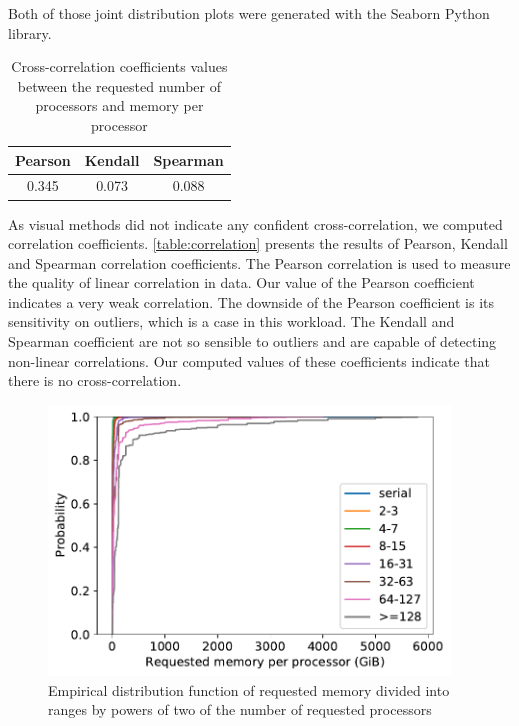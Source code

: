 \documentclass[thesis-en.tex]{subfiles}
\begin{document}
Both of those joint distribution plots were generated with the Seaborn \cite{michael_waskom_2017_883859} Python library.

\begin{table}[h]
\centering
\begin{tabular}{ |c|c|c| } 
 \hline
 Pearson & Kendall & Spearman \\ 
 \hline
 0.345 & 0.073 & 0.088 \\ 
 \hline
\end{tabular}
\caption{Cross-correlation coefficients values between the requested number of processors and memory per processor}
\label{table:correlation}
\end{table}

As visual methods did not  indicate any confident cross-correlation, we computed correlation coefficients. \autoref{table:correlation} presents the results of Pearson, Kendall and Spearman correlation coefficients. The Pearson correlation is used to measure the quality of linear correlation in data. Our value of the Pearson coefficient indicates a very weak correlation. The downside of the Pearson coefficient is its sensitivity on outliers, which is a case in this workload. The Kendall and Spearman coefficient are not so sensible to outliers and are capable of detecting non-linear correlations. Our computed values of these coefficients indicate that there is no cross-correlation.

\begin{figure}[p]
    \centering
    \includegraphics[width=0.95\textwidth]{images/cdf_ranges_many.pdf}
    \caption{Empirical distribution function of requested memory divided into ranges by powers of two of the number of requested processors}
    \label{fig:cdf-ranges-many}
\end{figure}
\end{document}
